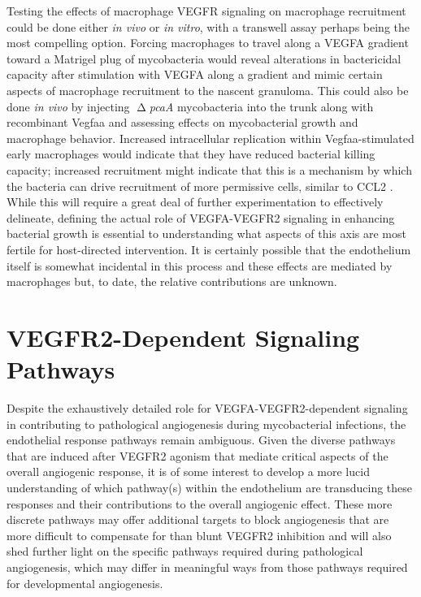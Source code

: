 Testing the effects of macrophage VEGFR signaling on macrophage recruitment could be done either \textit{in vivo} or \textit{in vitro}, with a transwell assay perhaps being the most compelling option. Forcing macrophages to travel along a VEGFA gradient toward a Matrigel plug of mycobacteria would reveal alterations in bactericidal capacity after stimulation with VEGFA along a gradient and mimic certain aspects of macrophage recruitment to the nascent granuloma. This could also be done \textit{in vivo} by injecting $\upDelta$\textit{pcaA} mycobacteria into the trunk along with recombinant Vegfaa and assessing effects on mycobacterial growth and macrophage behavior. Increased intracellular replication within Vegfaa-stimulated early macrophages would indicate that they have reduced bacterial killing capacity; increased recruitment might indicate that this is a mechanism by which the bacteria can drive recruitment of more permissive cells, similar to CCL2 \citep{Cambier2014b}. While this will require a great deal of further experimentation to effectively delineate, defining the actual role of VEGFA-VEGFR2 signaling in enhancing bacterial growth is essential to understanding what aspects of this axis are most fertile for host-directed intervention. It is certainly possible that the endothelium itself is somewhat incidental in this process and these effects are mediated by macrophages but, to date, the relative contributions are unknown. 

\section{VEGFR2\hyp{}Dependent Signaling Pathways}

Despite the exhaustively detailed role for VEGFA-VEGFR2-dependent signaling in contributing to pathological angiogenesis during mycobacterial infections, the endothelial response pathways remain ambiguous. Given the diverse pathways that are induced after VEGFR2 agonism that mediate critical aspects of the overall angiogenic response, it is of some interest to develop a more lucid understanding of which pathway(s) within the endothelium are transducing these responses and their contributions to the overall angiogenic effect. These more discrete pathways may offer additional targets to block angiogenesis that are more difficult to compensate for than blunt VEGFR2 inhibition and will also shed further light on the specific pathways required during pathological angiogenesis, which may differ in meaningful ways from those pathways required for developmental angiogenesis.

